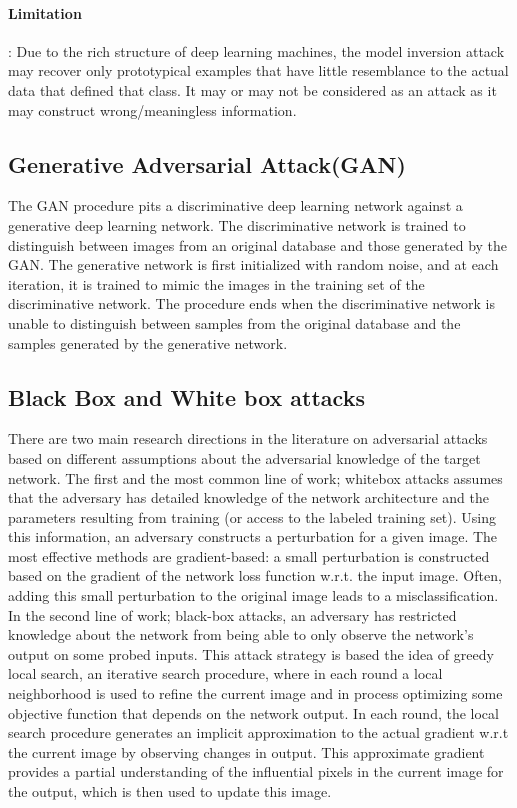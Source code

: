 \documentclass{article}
\begin{document}
\paragraph{Limitation}: Due to the rich structure of deep learning machines, the model inversion attack may recover only prototypical examples that have little resemblance to the actual data that defined that class. It may or may not be considered as an attack as it may construct wrong/meaningless information.
 
\subsection{Generative Adversarial Attack(GAN)} 
The GAN procedure pits a discriminative deep learning network against a generative deep learning network. The discriminative network is trained to distinguish between images from an original database and those generated by the GAN. The generative network is first initialized with random noise, and at each iteration, it is trained to mimic the images in the training set of the discriminative network. The procedure ends when the discriminative network is unable to distinguish between samples from the original database and the samples generated by the generative network.

\subsection{Black Box and White box attacks}
There are two main research directions in the literature on adversarial attacks based on different assumptions about the adversarial knowledge of the target network. The first and the most common line of work; whitebox attacks assumes that the adversary has detailed knowledge of the network architecture and the parameters resulting from training (or access to the labeled training set). Using this information, an adversary constructs a perturbation for a given image. The most effective methods are gradient-based: a small perturbation is constructed based on the gradient of the network loss function w.r.t. the input image. Often, adding this small perturbation to the original image leads to a misclassification. In the second line of work; black-box attacks, an adversary has restricted knowledge about the network from being able to only observe the network’s output on some probed inputs. This attack strategy is based the idea of greedy local search, an iterative search procedure, where in each round a local neighborhood is used to refine the current image and in process optimizing some objective function that depends on the network output. In each round, the local search procedure generates an implicit approximation to the actual gradient w.r.t the current image by observing changes in output. This approximate gradient provides a partial understanding of the influential pixels in the current image for the output, which is then used to update this image.
\end{document}
